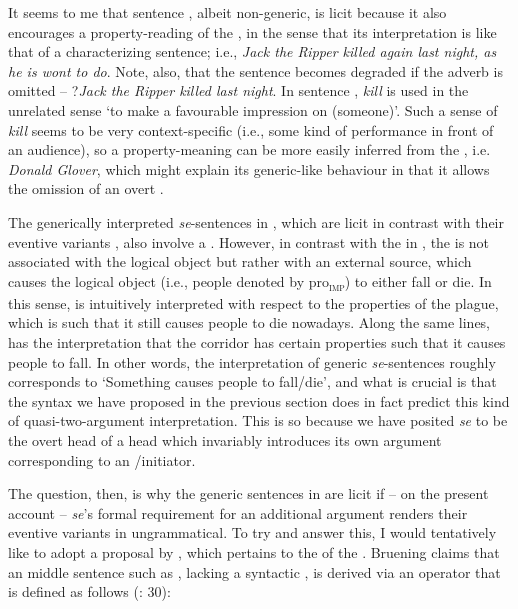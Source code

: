 \documentclass[output=paper,nonflat,newtxmath]{langsci/langscibook}
\begin{document}
{It seems to me that sentence , albeit non-generic, is licit because it also encourages a property-reading of the , in the sense that its interpretation is like that of a characterizing sentence; i.e., \textit{Jack the Ripper killed again last  night, as he is wont to do}. Note, also, that the sentence becomes degraded if the adverb is omitted -- ?\textit{Jack the Ripper killed last night}. In sentence , \textit{kill} is used in the unrelated sense `to make a favourable impression on (someone)'. Such a sense of \textit{kill} seems to be very context-specific (i.e., some kind of performance in front of an audience), so a property-meaning can be more easily inferred from the , i.e. \textit{Donald Glover}, which might explain its generic-like behaviour in that it allows the omission of an overt .}

The generically interpreted  \textit{se}-sentences in , which are licit in contrast with their eventive variants , also involve a . However, in contrast with the  in , the  is not associated with the logical object but rather with an external source, which causes the logical object (i.e., people denoted by pro\textsubscript{\textsc{imp}}) to either fall or die. In this sense,  is intuitively interpreted with respect to the properties of the plague, which is such that it still causes people to die nowadays. Along the same lines,  has the interpretation that the corridor has certain properties such that it causes people to fall. In other words, the interpretation of generic  \textit{se}-sentences roughly corresponds to `Something causes people to fall/die', and what is crucial is that the syntax we have proposed in the previous section does in fact predict this kind of quasi-two-argument interpretation. This is so because we have posited \textit{se} to be the overt head of a  head which invariably introduces its own argument corresponding to an /initiator.

The question, then, is why the generic sentences in  are licit if -- on the present account -- \textit{se}’s formal requirement for an additional argument renders their eventive variants in  ungrammatical.  To try and answer this, I would tentatively like to adopt a proposal by \citet{bruening2012}, which pertains to the  of the  .  Bruening claims that an  middle sentence such as , lacking a syntactic , is derived via an operator that is defined as follows (\citealt{bruening2012}: 30):
\end{document}
